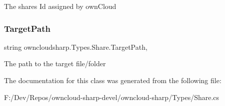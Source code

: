 The shares Id assigned by own\+Cloud 

\mbox{\label{classowncloudsharp_1_1_types_1_1_share_ac2ac95075f60cc369c9f2433f6b4db7d}} 
\subsubsection{\texorpdfstring{Target\+Path}{TargetPath}}
{\footnotesize\ttfamily string owncloudsharp.\+Types.\+Share.\+Target\+Path\hspace{0.3cm}{\ttfamily [get]}, {\ttfamily [set]}}



The path to the target file/folder 



The documentation for this class was generated from the following file\+:\begin{DoxyCompactItemize}
\item 
F\+:/\+Dev/\+Repos/owncloud-\/sharp-\/devel/owncloud-\/sharp/\+Types/Share.\+cs\end{DoxyCompactItemize}
